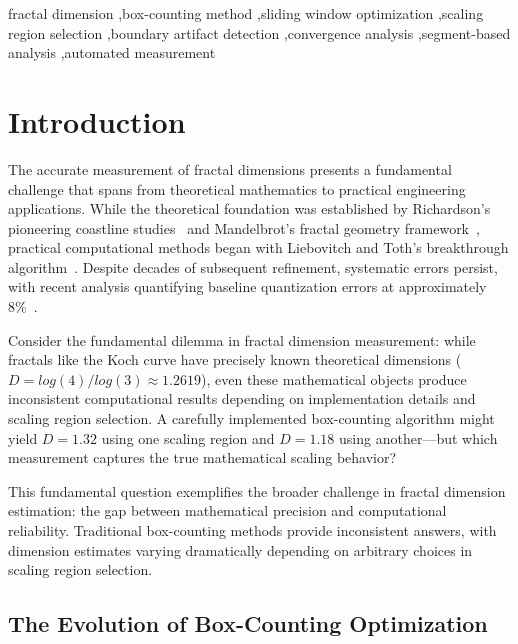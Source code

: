 \documentclass[preprint,12pt]{elsarticle}
\def\log{log}%
\begin{document}
\begin{frontmatter}
\begin{keyword}
fractal dimension \sep box-counting method \sep sliding window optimization \sep scaling region selection \sep boundary artifact detection \sep convergence analysis \sep segment-based analysis \sep automated measurement
\end{keyword}

\end{frontmatter}


\section{Introduction}
\label{sec:introduction}

The accurate measurement of fractal dimensions presents a fundamental challenge that spans from theoretical mathematics to practical engineering applications. While the theoretical foundation was established by Richardson's pioneering coastline studies~\cite{richardson1961} and Mandelbrot's fractal geometry framework~\cite{mandelbrot1967}, practical computational methods began with Liebovitch and Toth's breakthrough algorithm~\cite{liebovitch1989}. Despite decades of subsequent refinement, systematic errors persist, with recent analysis quantifying baseline quantization errors at approximately 8\%~\cite{bouda2016}.

Consider the fundamental dilemma in fractal dimension measurement: while fractals like the Koch curve have precisely known theoretical dimensions ($D = \log(4)/\log(3) \approx 1.2619$), even these mathematical objects produce inconsistent computational results depending on implementation details and scaling region selection. A carefully implemented box-counting algorithm might yield $D = 1.32$ using one scaling region and $D = 1.18$ using another—but which measurement captures the true mathematical scaling behavior?

This fundamental question exemplifies the broader challenge in fractal dimension estimation: the gap between mathematical precision and computational reliability. Traditional box-counting methods provide inconsistent answers, with dimension estimates varying dramatically depending on arbitrary choices in scaling region selection.

\subsection{The Evolution of Box-Counting Optimization}
\end{document}
